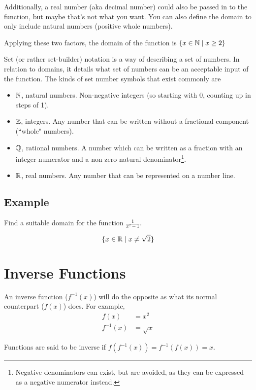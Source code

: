 Additionally, a real number (aka decimal number) could also be passed in to the function, but maybe that's not what you want. You can also define the domain to only include natural numbers (positive whole numbers).

Applying these two factors, the domain of the function is $\{x \in \mathbb{N} \mid x \geq 2\}$

Set (or rather set-builder) notation is a way of describing a set of numbers. In relation to domains, it details what set of numbers can be an acceptable input of the function. The kinds of set number symbols that exist commonly are
\begin{itemize}
	\item $\mathbb{N}$, natural numbers. Non-negative integers (so starting with 0, counting up in steps of 1).
	\item $\mathbb{Z}$, integers. Any number that can be written without a fractional component (``whole" numbers).
	\item $\mathbb{Q}$, rational numbers. A number which can be written as a fraction with an integer numerator and a non-zero natural denominator\footnote{Negative denominators can exist, but are avoided, as they can be expressed as a negative numerator instead.}.
	\item $\mathbb{R}$, real numbers. Any number that can be represented on a number line.
\end{itemize}

\subsection{Example}
Find a suitable domain for the function $\frac{1}{x^2-1}$.

\begin{equation*}
	\{x \in \mathbb{R} \mid x \neq \sqrt{2}\}
\end{equation*}


\section{Inverse Functions}
An inverse function ($f^{-1}(x)$) will do the opposite as what its normal counterpart ($f(x)$) does. For example,
\begin{align*}
	f(x) &= x^2\\
	f^{-1}(x)&=\sqrt{x}
\end{align*}

Functions are said to be inverse if $f\left(f^{-1}(x)\right) = f^{-1}\left(f(x)\right)=x$.

